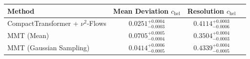     \begin{tabular}{lccc}
        \toprule
        Method & Mean Deviation $c_{\text{hel}}$ & Resolution $c_{\text{hel}}$ \\
        \midrule
        CompactTransformer + $\nu^2$-Flows & $0.0251^{+0.0004}_{-0.0003}$ & $0.4114^{+0.0003}_{-0.0006}$ \\
        MMT (Mean) & $0.0705^{+0.0005}_{-0.0004}$ & $0.3504^{+0.0004}_{-0.0003}$ \\
        MMT (Gaussian Sampling) & $0.0414^{+0.0006}_{-0.0005}$ & $0.4339^{+0.0004}_{-0.0005}$ \\
        \bottomrule
    \end{tabular}